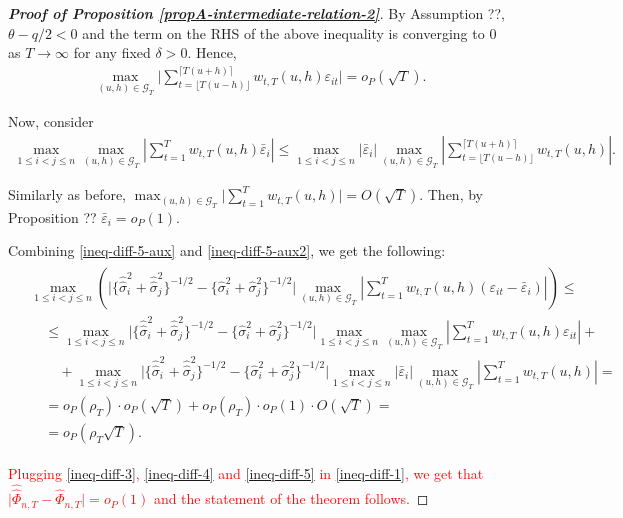 \documentclass[a4paper,12pt]{article}
\newcommand{\doublehattwo}[1]{\widehat{\widehat{#1}}}
\begin{document}
\begin{proof}[\textnormal{\textbf{Proof of Proposition \ref{propA-intermediate-relation-2}}}]
By Assumption ??, $\theta - q/2 <0$ and the term on the RHS of the above inequality is converging to $0$ as $T \to \infty$ for any fixed $\delta >0$. Hence, 
\begin{align}\label{ineq-diff-5-aux}
\max_{(u, h) \in \mathcal{G}_T} \Big| \sum_{t=\lfloor T(u-h) \rfloor}^{\lceil T(u+h) \rceil} w_{t,T}(u,h)\varepsilon_{it}  \Big| = o_P(\sqrt{T}).
\end{align}

Now, consider 
\begin{align*}
\max_{1 \le i < j \le n} \max_{(u,h) \in \mathcal{G}_T}\left| \sum_{t=1}^T w_{t,T}(u,h) \bar{\varepsilon}_i \right|   \leq \max_{1 \le i < j \le n} |\bar{\varepsilon}_i| \max_{(u,h) \in \mathcal{G}_T} \left| \sum_{t=\lfloor T(u-h) \rfloor}^{\lceil T(u+h) \rceil} w_{t,T}(u,h) \right|.
\end{align*}

Similarly as before, $\max_{(u,h) \in \mathcal{G}_T}  \Big| \sum_{t=1}^T w_{t,T}(u,h)  \Big| = O(\sqrt{T})$. Then, by Proposition ?? $\bar{\varepsilon}_i = o_P(1)$. 

Combining \eqref{ineq-diff-5-aux} and \eqref{ineq-diff-5-aux2}, we get the following:
\begin{align}\label{ineq-diff-5}
\begin{split}
&\max_{1 \le i < j \le n} \left(\big|\{\doublehattwo{\sigma}_i^2 + \doublehattwo{\sigma}_j^2 \}^{-1/2} - \{\widehat{\sigma}_i^2 + \widehat{\sigma}_j^2 \}^{-1/2}\big| \max_{(u,h) \in \mathcal{G}_T}\left| \sum_{t=1}^T w_{t,T}(u,h) (\varepsilon_{it} - \bar{\varepsilon}_i) \right| \right) \leq \\
&\quad\leq \max_{1\le i < j \le n}\big|\{\doublehattwo{\sigma}_i^2 + \doublehattwo{\sigma}_j^2 \}^{-1/2} - \{\widehat{\sigma}_i^2 + \widehat{\sigma}_j^2 \}^{-1/2}\big|\max_{1\le i < j \le n}\max_{(u,h) \in \mathcal{G}_T}\left| \sum_{t=1}^T w_{t,T}(u,h) \varepsilon_{it} \right| + \\
&\quad\quad+ \max_{1\le i < j \le n}\big|\{\doublehattwo{\sigma}_i^2 + \doublehattwo{\sigma}_j^2 \}^{-1/2} - \{\widehat{\sigma}_i^2 + \widehat{\sigma}_j^2 \}^{-1/2}\big|\max_{1\le i < j \le n}|\bar{\varepsilon}_i|\max_{(u,h) \in \mathcal{G}_T}\left| \sum_{t=1}^T w_{t,T}(u,h) \right| = \\
&\quad= o_P(\rho_T) \cdot o_P(\sqrt{T}) + o_P(\rho_T) \cdot o_P(1) \cdot O(\sqrt{T}) = \\
&\quad = o_P(\rho_T \sqrt{T}).
\end{split}
\end{align}

\textcolor{red}{Plugging \eqref{ineq-diff-3}, \eqref{ineq-diff-4} and \eqref{ineq-diff-5} in \eqref{ineq-diff-1}, we get that $\big|\doublehattwo{\Phi}_{n,T} - \widehat{\Phi}_{n,T}\big| = o_P(1)$ and the statement of the theorem follows.}
\end{proof}
\end{document}
